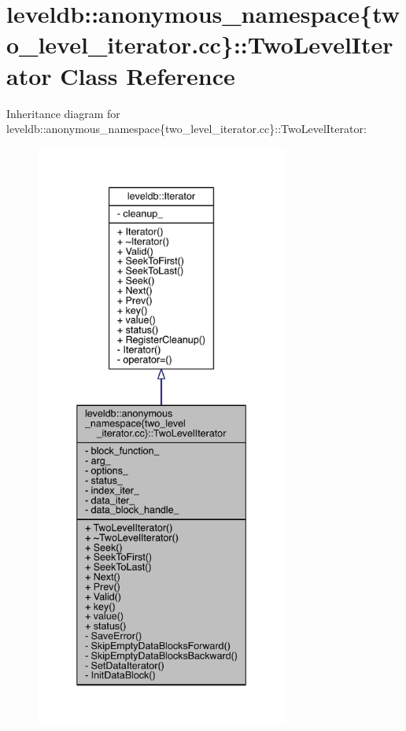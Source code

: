 \hypertarget{classleveldb_1_1anonymous__namespace_02two__level__iterator_8cc_03_1_1_two_level_iterator}{}\section{leveldb\+:\+:anonymous\+\_\+namespace\{two\+\_\+level\+\_\+iterator.\+cc\}\+:\+:Two\+Level\+Iterator Class Reference}
\label{classleveldb_1_1anonymous__namespace_02two__level__iterator_8cc_03_1_1_two_level_iterator}


Inheritance diagram for leveldb\+:\+:anonymous\+\_\+namespace\{two\+\_\+level\+\_\+iterator.\+cc\}\+:\+:Two\+Level\+Iterator\+:
\nopagebreak
\begin{figure}[H]
\begin{center}
\leavevmode
\includegraphics[height=550pt]{classleveldb_1_1anonymous__namespace_02two__level__iterator_8cc_03_1_1_two_level_iterator__inherit__graph}
\end{center}
\end{figure}


